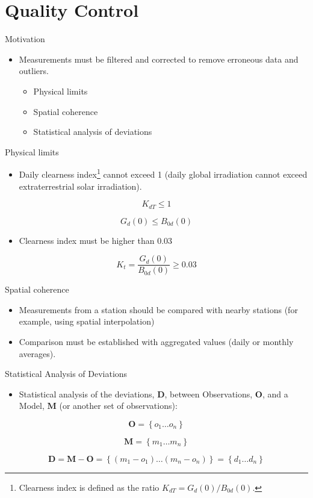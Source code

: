 \documentclass[xcolor={usenames,svgnames,dvipsnames}]{beamer}
\begin{document}
\section{Quality Control}
\label{sec:orgb669fde}
\begin{frame}[label={sec:org20e3531}]{Motivation}
\begin{itemize}
\item Measurements must be filtered and corrected to remove erroneous data and outliers.
\begin{itemize}
\item Physical limits
\item Spatial coherence
\item Statistical analysis of deviations
\end{itemize}
\end{itemize}
\end{frame}


\begin{frame}[label={sec:org84eb724}]{Physical limits}
\begin{itemize}
\item Daily clearness index\footnote{Clearness index is defined as the ratio \(K_{dT} = G_d(0) / B_{0d}(0)\).} cannot exceed 1 (daily global irradiation cannot exceed extraterrestrial solar irradiation).
\end{itemize}
\[
  K_{dT} \leq 1
\]

\[
G_d(0) \leq B_{0d}(0)
\]

\begin{itemize}
\item Clearness index must be higher than 0.03
\end{itemize}
\[
K_t = \frac{G_d(0)}{B_{0d}(0)} \geq 0.03
\]
\end{frame}

\begin{frame}[label={sec:orgf5bd61e}]{Spatial coherence}
\begin{itemize}
\item Measurements from a station should be compared with \alert{nearby stations} (for example, using spatial interpolation)
\item Comparison must be established with \alert{aggregated values} (daily or monthly averages).
\end{itemize}
\end{frame}

\begin{frame}[label={sec:org225bce2}]{Statistical Analysis of Deviations}
\begin{itemize}
\item Statistical analysis of the deviations, \(\mathbf{D}\), between Observations, \(\mathbf{O}\), and a Model, \(\mathbf{M}\) (or another set of observations):
\end{itemize}

\[
\mathbf{O} = \left\{ o_1 \dots o_n \right\}
\]

\[
\mathbf{M} = \left\{ m_1 \dots m_n  \right\}
\]

\[
\mathbf{D} = \mathbf{M} - \mathbf{O} =  \left\{ (m_1 - o_1) \dots (m_n - o_n)  \right\} = \left\{ d_1 \dots d_n  \right\}
\]
\end{frame}
\end{document}
